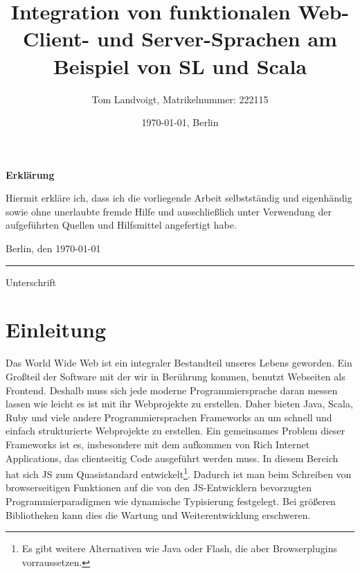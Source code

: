 \documentclass[12pt]{scrreprt}
\title{Integration von funktionalen Web-Client- und Server-Sprachen am Beispiel von SL und Scala}
\author{Tom Landvoigt, Matrikelnummer: 222115}
\date{\today{}, Berlin}
\begin{document}
\maketitle
\tableofcontents   %
\listoffigures     %
\listoftables      %
\lstlistoflistings %
\newpage
\thispagestyle{empty}		%
\begin{LARGE}
	\textbf{Erklärung}
\end{LARGE}

\vspace{1cm}

Hiermit erkläre ich, dass ich die vorliegende Arbeit selbstständig und eigenhändig sowie ohne unerlaubte fremde Hilfe und ausschließlich unter Verwendung der aufgeführten Quellen und Hilfsmittel angefertigt habe.
\vspace{2cm}

Berlin, den \today

\vspace{1cm}

\rule{0.3\textwidth}{0.4pt}

Unterschrift

\vspace*{6cm}
\newpage


\lstset{basicstyle=\ttfamily\small, numbers=left, numberstyle=\tiny}

\section{Einleitung}

Das World Wide Web ist ein integraler Bestandteil unseres Lebens geworden. Ein Großteil der Software mit der wir in Berührung kommen, benutzt Webseiten als Frontend. Deshalb muss sich jede moderne Programmiersprache daran messen lassen wie leicht es ist mit ihr Webprojekte zu erstellen. Daher bieten Java, Scala, Ruby und viele andere Programmiersprachen Frameworks an um schnell und einfach strukturierte Webprojekte zu erstellen. Ein gemeinsames Problem dieser Frameworks ist es, insbesondere mit dem aufkommen von Rich Internet Applications, das clientseitig Code ausgeführt werden muss. In diesem Bereich hat sich \ac{JS} zum Quasistandard entwickelt\footnote{Es gibt weitere Alternativen wie Java oder Flash, die aber Browserplugins vorraussetzen.}. Dadurch ist man beim Schreiben von browserseitigen Funktionen auf die von den \ac{JS}-Entwicklern bevorzugten Programmierparadigmen wie dynamische Typisierung festgelegt. Bei größeren Bibliotheken kann dies die Wartung und Weiterentwicklung erschweren.
\end{document}

